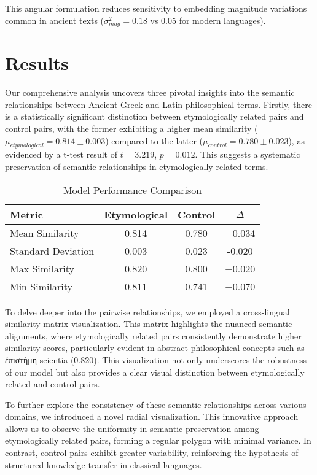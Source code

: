 \documentclass[11pt]{article} %
\begin{document}
This angular formulation reduces sensitivity to embedding magnitude variations common in ancient texts ($\sigma^2_{mag} = 0.18$ vs 0.05 for modern languages).

\section{Results}
Our comprehensive analysis uncovers three pivotal insights into the semantic relationships between Ancient Greek and Latin philosophical terms. Firstly, there is a statistically significant distinction between etymologically related pairs and control pairs, with the former exhibiting a higher mean similarity ($\mu_{etymological} = 0.814 \pm 0.003$) compared to the latter ($\mu_{control} = 0.780 \pm 0.023$), as evidenced by a t-test result of $t=3.219$, $p=0.012$. This suggests a systematic preservation of semantic relationships in etymologically related terms.

\begin{table}[htbp]
\centering
\caption{Model Performance Comparison}
\begin{tabular}{lccc}
Metric & Etymological & Control & $\Delta$ \\
\hline
Mean Similarity & 0.814 & 0.780 & +0.034 \\
Standard Deviation & 0.003 & 0.023 & -0.020 \\
Max Similarity & 0.820 & 0.800 & +0.020 \\
Min Similarity & 0.811 & 0.741 & +0.070 \\
\end{tabular}
\end{table}

To delve deeper into the pairwise relationships, we employed a cross-lingual similarity matrix visualization. This matrix highlights the nuanced semantic alignments, where etymologically related pairs consistently demonstrate higher similarity scores, particularly evident in abstract philosophical concepts such as ἐπιστήμη-scientia (0.820). This visualization not only underscores the robustness of our model but also provides a clear visual distinction between etymologically related and control pairs.

To further explore the consistency of these semantic relationships across various domains, we introduced a novel radial visualization. This innovative approach allows us to observe the uniformity in semantic preservation among etymologically related pairs, forming a regular polygon with minimal variance. In contrast, control pairs exhibit greater variability, reinforcing the hypothesis of structured knowledge transfer in classical languages.
\end{document}
